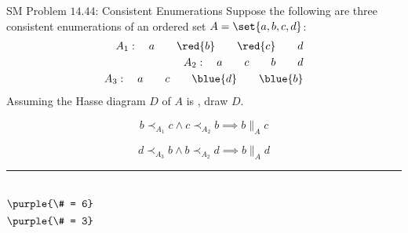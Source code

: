 \begin{frame}{}
  \begin{exampleblock}{SM Problem $14.44$: Consistent Enumerations}
    Suppose the following are three consistent enumerations of an ordered set $A = \set{a, b, c, d}$:
    \begin{align*}
      A_1: \quad a \qquad \red{b} \qquad \red{c} \qquad d \\
      A_2: \quad a \qquad c \qquad b \qquad d \\
      A_3: \quad a \qquad c \qquad \blue{d} \qquad \blue{b}
    \end{align*}
    Assuming the Hasse diagram $D$ of $A$ is , draw $D$.
  \end{exampleblock}

  \pause
  \[
    b \prec_{A_1} c \land c \prec_{A_2} b \implies b \parallel_{A} c
  \]

  \[
    d \prec_{A_3} b \land b \prec_{A_2} d \implies b \parallel_{A} d
  \]
\end{frame}

\begin{frame}{}

  \hrule
  \begin{columns}[t]
    \pause
      \pause
      \[
	\purple{\# = 6}
      \]
    \pause
      \pause
      \[
	\purple{\# = 3}
      \]
  \end{columns}
\end{frame}

\begin{frame}{}
  \begin{figure}
    \centering
    \resizebox{0.90\textwidth}{!}{}
  \end{figure}

\end{frame}
